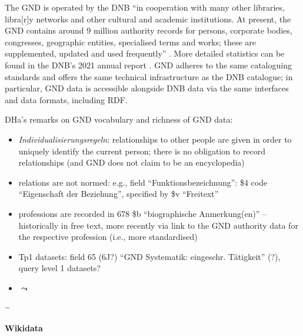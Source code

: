 The \gls{GND} is operated by the \gls{DNB}
\enquote{in cooperation with many other libraries, libra[r]y networks and other cultural and academic institutions.
At present, the GND contains around 9 million authority records for persons, corporate bodies, congresses, geographic entities, specialised terms and works; these are supplemented, updated and used frequently} \autocite{DNB_cataloguing}. More detailed statistics can be found in the DNB's
2021 annual report \autocite[p.49]{DNB_Jahresbericht_2021}.
GND adheres to the same cataloguing standards and offers the same technical infrastructure
as the DNB catalogue; in particular, GND data is accessible alongside DNB data
via the same interfaces and data formats, including RDF.




DHa's remarks on GND vocabulary and richness of GND data:
%
\begin{itemize}
  \item
    \emph{Individualisierungsregeln}: relationships to other people are given in order to uniquely
    identify the current person; there is no obligation to record relationships
    (and GND does not claim to be an encyclopedia)
  \item
    relations are not normed:
    e.g., field \enquote{Funktionsbezeichnung}: \$4 code \enquote{Eigenschaft der Beziehung},
    specified by \$v \enquote{Freitext}
  \item
    professions are recorded in 678 \$b \enquote{biographische Anmerkung(en)} --
    historically in free text,
    more recently via link to the GND authority data for the respective profession (i.e., more standardised)
  \item
    Tp1 datasets: field 65 (6J?) \enquote{GND Systematik: eingeschr. Tätigkeit} (?),
    query level 1 datasets?
  \item
    $\leadsto$ 
\end{itemize}


\dots


\paragraph{Wikidata}

